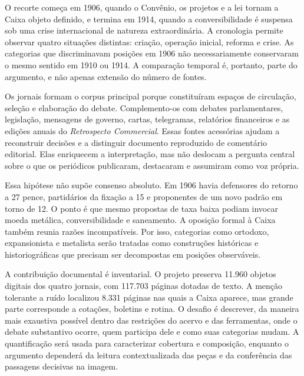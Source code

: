 O recorte começa em 1906, quando o Convênio, os projetos e a lei tornam a Caixa objeto definido, e termina em 1914, quando a conversibilidade é suspensa sob uma crise internacional de natureza extraordinária. A cronologia permite observar quatro situações distintas: criação, operação inicial, reforma e crise. As categorias que discriminavam posições em 1906 não necessariamente conservaram o mesmo sentido em 1910 ou 1914. A comparação temporal é, portanto, parte do argumento, e não apenas extensão do número de fontes.

Os jornais formam o corpus principal porque constituíram espaços de circulação, seleção e elaboração do debate. Complemento-os com debates parlamentares, legislação, mensagens de governo, cartas, telegramas, relatórios financeiros e as edições anuais do \textit{Retrospecto Commercial}. Essas fontes acessórias ajudam a reconstruir decisões e a distinguir documento reproduzido de comentário editorial. Elas enriquecem a interpretação, mas não deslocam a pergunta central sobre o que os periódicos publicaram, destacaram e assumiram como voz própria.


Essa hipótese não supõe consenso absoluto. Em 1906 havia defensores do retorno a 27 pence, partidários da fixação a 15 e proponentes de um novo padrão em torno de 12. O ponto é que mesmo propostas de taxa baixa podiam invocar moeda metálica, conversibilidade e saneamento. A oposição formal à Caixa também reunia razões incompatíveis. Por isso, categorias como ortodoxo, expansionista e metalista serão tratadas como construções históricas e historiográficas que precisam ser decompostas em posições observáveis.

A contribuição documental é inventarial. O projeto preserva 11.960 objetos digitais dos quatro jornais, com 117.703 páginas dotadas de texto. A menção tolerante a ruído localizou 8.331 páginas nas quais a Caixa aparece, mas grande parte corresponde a cotações, boletins e rotina. O desafio é descrever, da maneira mais exaustiva possível dentro das restrições do acervo e das ferramentas, onde o debate substantivo ocorre, quem participa dele e como suas categorias mudam. A quantificação será usada para caracterizar cobertura e composição, enquanto o argumento dependerá da leitura contextualizada das peças e da conferência das passagens decisivas na imagem.

